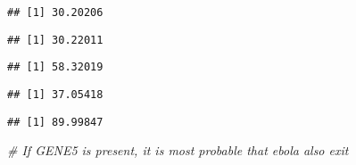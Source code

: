 \documentclass[
]{article}
\newenvironment{Shaded}{\begin{snugshade}}{\end{snugshade}}
\newcommand{\CommentTok}[1]{\textcolor[rgb]{0.56,0.35,0.01}{\textit{#1}}}
\newcommand{\DecValTok}[1]{\textcolor[rgb]{0.00,0.00,0.81}{#1}}
\newcommand{\FloatTok}[1]{\textcolor[rgb]{0.00,0.00,0.81}{#1}}
\newcommand{\FunctionTok}[1]{\textcolor[rgb]{0.13,0.29,0.53}{\textbf{#1}}}
\newcommand{\NormalTok}[1]{#1}
\newcommand{\SpecialCharTok}[1]{\textcolor[rgb]{0.81,0.36,0.00}{\textbf{#1}}}
\newcommand{\StringTok}[1]{\textcolor[rgb]{0.31,0.60,0.02}{#1}}
\begin{document}
\begin{verbatim}
## [1] 30.20206
\end{verbatim}

\begin{Shaded}
\end{Shaded}

\begin{verbatim}
## [1] 30.22011
\end{verbatim}

\begin{Shaded}
\end{Shaded}

\begin{verbatim}
## [1] 58.32019
\end{verbatim}

\begin{Shaded}
\end{Shaded}

\begin{verbatim}
## [1] 37.05418
\end{verbatim}

\begin{Shaded}
\end{Shaded}

\begin{verbatim}
## [1] 89.99847
\end{verbatim}

\begin{Shaded}
\begin{Highlighting}[]
\CommentTok{\# If GENE5 is present, it is most probable that ebola also exit}
\end{Highlighting}
\end{Shaded}
\end{document}

